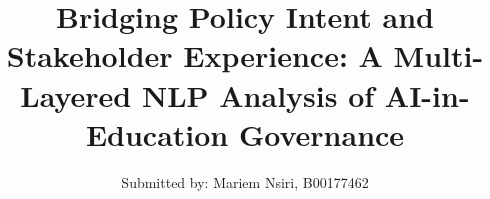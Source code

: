 \documentclass[oneside,11pt, hidelinks]{Classes/ProjectPDF}
\title{Bridging Policy Intent and Stakeholder Experience: A Multi-Layered NLP Analysis of AI-in-Education Governance}
\author{Submitted by: Mariem Nsiri, B00177462}
\begin{document}
      
     

%      
  
  
   
\maketitle    
  
  
\setcounter{secnumdepth}{3}
\setcounter{tocdepth}{3}  
   
\frontmatter %
  

   
    
         
\tableofcontents      
\newpage        
\listoftables          
\newpage     
\listoffigures        
         
\mainmatter     
  
      
      
      
        
        
   
  
\renewcommand{\bibname}{References} 
\renewcommand{\bibfont}{\small}       
\begin{singlespace}   
  \setlength{\itemsep}{0pt}                   
           
\end{singlespace}        
                  
                
           
%             
%                   
%         
           
      
\end{document}
